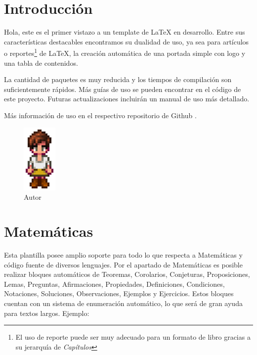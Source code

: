 \section{Introducción}

Hola, este es el primer vistazo a un template de \LaTeX{} en desarrollo. Entre sus características destacables encontramos su dualidad de uso, ya sea para artículos o reportes\footnote{El uso de reporte puede ser muy adecuado para un formato de libro gracias a su jerarquía de \textit{Capítulos}} de \LaTeX{}, la creación automática de una portada simple con logo y una tabla de contenidos.

La cantidad de paquetes es muy reducida y los tiempos de compilación son suficientemente rápidos. Más guías de uso se pueden encontrar en el código de este proyecto. Futuras actualizaciones incluirán un manual de uso más detallado. 

Más información de uso en el respectivo repositorio de Github \cite{opc:autor}.

\begin{figure}[h]
    \centering
    \includegraphics[width=0.15\textwidth]{src/img/logo/author.pdf}
    \caption{Autor}
    \label{fig:authorvector}
\end{figure}

\newpage

\section{Matemáticas}

Esta plantilla posee amplio soporte para todo lo que respecta a Matemáticas y código fuente de diversos lenguajes. Por el apartado de Matemáticas es posible realizar bloques automáticos de Teoremas, Corolarios, Conjeturas, Proposiciones, Lemas, Preguntas, Afirmaciones, Propiedades, Definiciones, Condiciones, Notaciones, Soluciones, Observaciones, Ejemplos y Ejercicios. Estos bloques cuentan con un sistema de enumeración automático, lo que será de gran ayuda para textos largos. Ejemplo:



